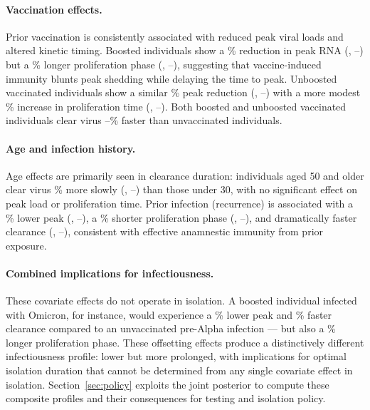 \documentclass[12pt]{article}
\begin{document}
\paragraph{Vaccination effects.} Prior vaccination is consistently associated with reduced peak viral loads and altered kinetic timing. Boosted individuals show a \CovBoostDPPctDown\% reduction in peak RNA (\CovBoostDP, \CovBoostDPLo--\CovBoostDPHi) but a \CovBoostWPPctUp\% longer proliferation phase (\CovBoostWP, \CovBoostWPLo--\CovBoostWPHi), suggesting that vaccine-induced immunity blunts peak shedding while delaying the time to peak. Unboosted vaccinated individuals show a similar \CovVaxDPPctDown\% peak reduction (\CovVaxDP, \CovVaxDPLo--\CovVaxDPHi) with a more modest \CovVaxWPPctUp\% increase in proliferation time (\CovVaxWP, \CovVaxWPLo--\CovVaxWPHi). Both boosted and unboosted vaccinated individuals clear virus \CovVaxWRPctDown--\CovBoostWRPctDown\% faster than unvaccinated individuals. 

\paragraph{Age and infection history.} Age effects are primarily seen in clearance duration: individuals aged 50 and older clear virus \CovAgeFiftyPlusWRPctUp\% more slowly (\CovAgeFiftyPlusWR, \CovAgeFiftyPlusWRLo--\CovAgeFiftyPlusWRHi) than those under 30, with no significant effect on peak load or proliferation time. Prior infection (recurrence) is associated with a \CovRecDPPctDown\% lower peak (\CovRecDP, \CovRecDPLo--\CovRecDPHi), a \CovRecWPPctDown\% shorter proliferation phase (\CovRecWP, \CovRecWPLo--\CovRecWPHi), and dramatically faster clearance (\CovRecWR, \CovRecWRLo--\CovRecWRHi), consistent with effective anamnestic immunity from prior exposure.

\paragraph{Combined implications for infectiousness.} These covariate effects do not operate in isolation. A boosted individual infected with Omicron, for instance, would experience a \CovBoostDPPctDown\% lower peak and \CovOmicronWRPctDown\% faster clearance compared to an unvaccinated pre-Alpha infection --- but also a \CovBoostWPPctUp\% longer proliferation phase. These offsetting effects produce a distinctively different infectiousness profile: lower but more prolonged, with implications for optimal isolation duration that cannot be determined from any single covariate effect in isolation. Section~\ref{sec:policy} exploits the joint posterior to compute these composite profiles and their consequences for testing and isolation policy.
\end{document}
